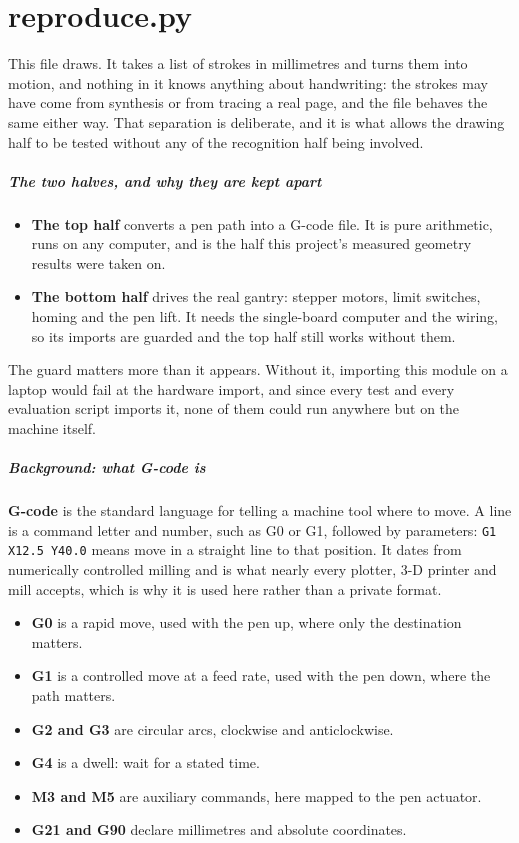 
\chapter{reproduce.py}
This file draws. It takes a list of strokes in millimetres and turns them into motion, and nothing in it knows anything about handwriting: the strokes may have come from synthesis or from tracing a real page, and the file behaves the same either way. That separation is deliberate, and it is what allows the drawing half to be tested without any of the recognition half being involved.


\paragraph{The two halves, and why they are kept apart}

\begin{itemize}\setlength\itemsep{0pt}
  \item \textbf{The top half} converts a pen path into a G-code file. It is pure arithmetic, runs on any computer, and is the half this project's measured geometry results were taken on.
  \item \textbf{The bottom half} drives the real gantry: stepper motors, limit switches, homing and the pen lift. It needs the single-board computer and the wiring, so its imports are guarded and the top half still works without them.
\end{itemize}
The guard matters more than it appears. Without it, importing this module on a laptop would fail at the hardware import, and since every test and every evaluation script imports it, none of them could run anywhere but on the machine itself.


\paragraph{Background: what G-code is}
\textbf{G-code} is the standard language for telling a machine tool where to move. A line is a command letter and number, such as G0 or G1, followed by parameters: \texttt{G1 X12.5 Y40.0} means move in a straight line to that position. It dates from numerically controlled milling and is what nearly every plotter, 3-D printer and mill accepts, which is why it is used here rather than a private format.


\begin{itemize}\setlength\itemsep{0pt}
  \item \textbf{G0} is a rapid move, used with the pen up, where only the destination matters.
  \item \textbf{G1} is a controlled move at a feed rate, used with the pen down, where the path matters.
  \item \textbf{G2 and G3} are circular arcs, clockwise and anticlockwise.
  \item \textbf{G4} is a dwell: wait for a stated time.
  \item \textbf{M3 and M5} are auxiliary commands, here mapped to the pen actuator.
  \item \textbf{G21 and G90} declare millimetres and absolute coordinates.
\end{itemize}

